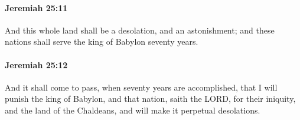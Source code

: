 		\paragraph{Jeremiah 25:11} %
			\label{JEREMIAH-25-11}

			And this whole land shall be a desolation, and an astonishment; and these nations shall serve the king of Babylon seventy years.


		\paragraph{Jeremiah 25:12} %
			\label{JEREMIAH-25-12}

			And it shall come to pass, when seventy years are accomplished, that I will punish the king of Babylon, and that nation, saith the LORD, for their iniquity, and the land of the Chaldeans, and will make it perpetual desolations.


